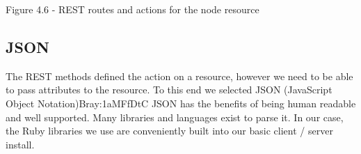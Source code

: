         Figure 4.6 - REST routes and actions for the node resource
\subsection{JSON}
        The REST methods defined the action on a resource, however we need to be able to pass attributes to the resource. To this end we selected JSON (JavaScript Object Notation){Bray:1aMFfDtC} JSON has the benefits of being human readable and well supported. Many libraries and languages exist to parse it. In our case, the Ruby libraries we use are conveniently built into our basic client / server install.  





